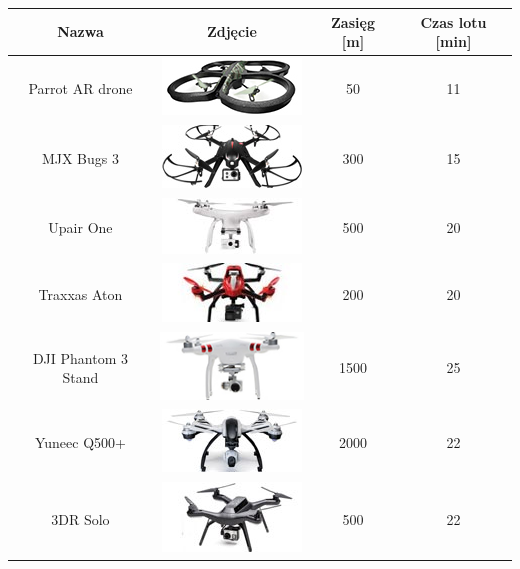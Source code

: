 \begin{longtable}{|c|c|c|c|} \hline
	    Nazwa & Zdjęcie & Zasięg [m] & Czas lotu [min] \\ \hline
    	    Parrot AR drone & \includegraphics{zalaczniki/obrazy/drony_miniaturki/parrot.jpg} & 50 & 11 \\ \hline
    	    MJX Bugs 3 & \includegraphics{zalaczniki/obrazy/drony_miniaturki/mjx.jpg} & 300 & 15 \\ \hline
    	    Upair One & \includegraphics{zalaczniki/obrazy/drony_miniaturki/upair.jpg} & 500 & 20 \\ \hline
    	    Traxxas Aton & \includegraphics{zalaczniki/obrazy/drony_miniaturki/TRAXXAS.jpg} & 200 & 20 \\ \hline
    	    DJI Phantom 3 Stand & \includegraphics{zalaczniki/obrazy/drony_miniaturki/dji-phantom-3-standard.jpg} & 1500 & 25 \\ \hline
    	    Yuneec Q500+ & \includegraphics{zalaczniki/obrazy/drony_miniaturki/yuneec.jpg} & 2000 & 22 \\ \hline
    	    3DR Solo & \includegraphics{zalaczniki/obrazy/drony_miniaturki/3dr-solo.jpg} & 500 & 22 \\ \hline

\end{longtable}
